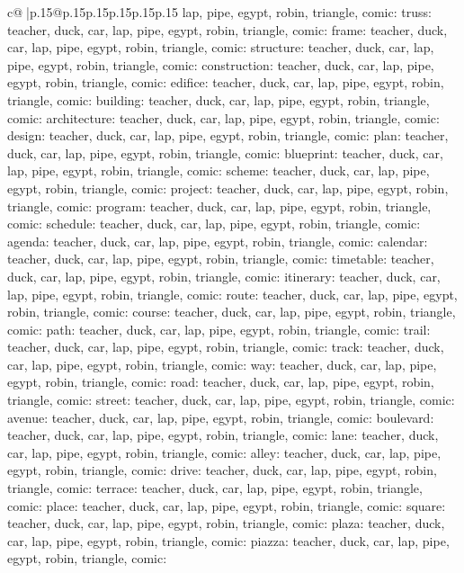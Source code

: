 \documentclass{article}
\begin{document}
{\begin{supertabular}{c@{$\;$}|p{.15\linewidth}@{}p{.15\linewidth}p{.15\linewidth}p{.15\linewidth}p{.15\linewidth}p{.15\linewidth}}
{{{lap, pipe, egypt, robin, triangle, comic\n\nCLUE: truss\nTARGETS: teacher, duck, car, lap, pipe, egypt, robin, triangle, comic\n\nCLUE: frame\nTARGETS: teacher, duck, car, lap, pipe, egypt, robin, triangle, comic\n\nCLUE: structure\nTARGETS: teacher, duck, car, lap, pipe, egypt, robin, triangle, comic\n\nCLUE: construction\nTARGETS: teacher, duck, car, lap, pipe, egypt, robin, triangle, comic\n\nCLUE: edifice\nTARGETS: teacher, duck, car, lap, pipe, egypt, robin, triangle, comic\n\nCLUE: building\nTARGETS: teacher, duck, car, lap, pipe, egypt, robin, triangle, comic\n\nCLUE: architecture\nTARGETS: teacher, duck, car, lap, pipe, egypt, robin, triangle, comic\n\nCLUE: design\nTARGETS: teacher, duck, car, lap, pipe, egypt, robin, triangle, comic\n\nCLUE: plan\nTARGETS: teacher, duck, car, lap, pipe, egypt, robin, triangle, comic\n\nCLUE: blueprint\nTARGETS: teacher, duck, car, lap, pipe, egypt, robin, triangle, comic\n\nCLUE: scheme\nTARGETS: teacher, duck, car, lap, pipe, egypt, robin, triangle, comic\n\nCLUE: project\nTARGETS: teacher, duck, car, lap, pipe, egypt, robin, triangle, comic\n\nCLUE: program\nTARGETS: teacher, duck, car, lap, pipe, egypt, robin, triangle, comic\n\nCLUE: schedule\nTARGETS: teacher, duck, car, lap, pipe, egypt, robin, triangle, comic\n\nCLUE: agenda\nTARGETS: teacher, duck, car, lap, pipe, egypt, robin, triangle, comic\n\nCLUE: calendar\nTARGETS: teacher, duck, car, lap, pipe, egypt, robin, triangle, comic\n\nCLUE: timetable\nTARGETS: teacher, duck, car, lap, pipe, egypt, robin, triangle, comic\n\nCLUE: itinerary\nTARGETS: teacher, duck, car, lap, pipe, egypt, robin, triangle, comic\n\nCLUE: route\nTARGETS: teacher, duck, car, lap, pipe, egypt, robin, triangle, comic\n\nCLUE: course\nTARGETS: teacher, duck, car, lap, pipe, egypt, robin, triangle, comic\n\nCLUE: path\nTARGETS: teacher, duck, car, lap, pipe, egypt, robin, triangle, comic\n\nCLUE: trail\nTARGETS: teacher, duck, car, lap, pipe, egypt, robin, triangle, comic\n\nCLUE: track\nTARGETS: teacher, duck, car, lap, pipe, egypt, robin, triangle, comic\n\nCLUE: way\nTARGETS: teacher, duck, car, lap, pipe, egypt, robin, triangle, comic\n\nCLUE: road\nTARGETS: teacher, duck, car, lap, pipe, egypt, robin, triangle, comic\n\nCLUE: street\nTARGETS: teacher, duck, car, lap, pipe, egypt, robin, triangle, comic\n\nCLUE: avenue\nTARGETS: teacher, duck, car, lap, pipe, egypt, robin, triangle, comic\n\nCLUE: boulevard\nTARGETS: teacher, duck, car, lap, pipe, egypt, robin, triangle, comic\n\nCLUE: lane\nTARGETS: teacher, duck, car, lap, pipe, egypt, robin, triangle, comic\n\nCLUE: alley\nTARGETS: teacher, duck, car, lap, pipe, egypt, robin, triangle, comic\n\nCLUE: drive\nTARGETS: teacher, duck, car, lap, pipe, egypt, robin, triangle, comic\n\nCLUE: terrace\nTARGETS: teacher, duck, car, lap, pipe, egypt, robin, triangle, comic\n\nCLUE: place\nTARGETS: teacher, duck, car, lap, pipe, egypt, robin, triangle, comic\n\nCLUE: square\nTARGETS: teacher, duck, car, lap, pipe, egypt, robin, triangle, comic\n\nCLUE: plaza\nTARGETS: teacher, duck, car, lap, pipe, egypt, robin, triangle, comic\n\nCLUE: piazza\nTARGETS: teacher, duck, car, lap, pipe, egypt, robin, triangle, comic\n\nCLUE: }}}
\end{supertabular}}
\end{document}
